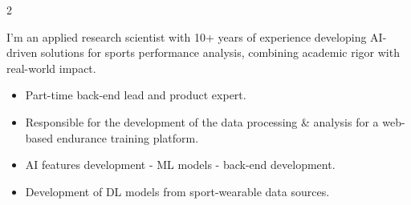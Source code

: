 \documentclass[10pt,a4paper,ragged2e,withhyper]{altacv}
\begin{document}
\begin{paracol}{2}


I'm an applied research scientist with 10+ years of experience developing AI-driven solutions for sports performance analysis, combining academic rigor with real-world impact. 


\begin{itemize}
\item Part-time back-end lead and product expert. 
\item Responsible for the development of the data processing \& analysis for a web-based endurance training platform. 
\end{itemize}

\divider

\begin{itemize}
\item AI features development - ML models - back-end development. 
\end{itemize}

\divider

\begin{itemize}
\item Development of DL models from sport-wearable data sources. 
\end{itemize}



\divider\\
\divider\\


\end{paracol}
\end{document}
